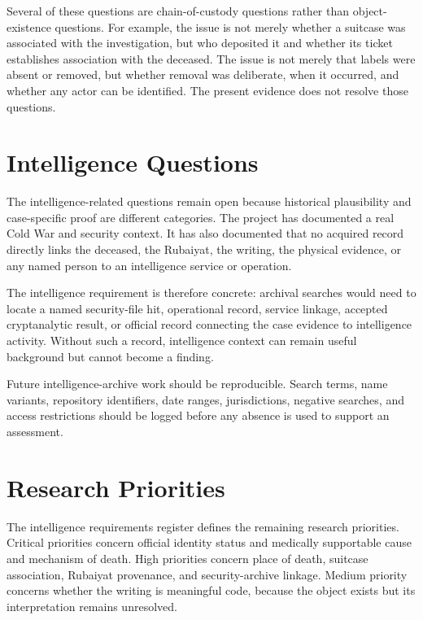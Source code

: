 Several of these questions are chain-of-custody questions rather than object-existence questions. For example, the issue is not merely whether a suitcase was associated with the investigation, but who deposited it and whether its ticket establishes association with the deceased. The issue is not merely that labels were absent or removed, but whether removal was deliberate, when it occurred, and whether any actor can be identified. The present evidence does not resolve those questions.

\section{Intelligence Questions}

The intelligence-related questions remain open because historical plausibility and case-specific proof are different categories. The project has documented a real Cold War and security context. It has also documented that no acquired record directly links the deceased, the Rubaiyat, the writing, the physical evidence, or any named person to an intelligence service or operation.

The intelligence requirement is therefore concrete: archival searches would need to locate a named security-file hit, operational record, service linkage, accepted cryptanalytic result, or official record connecting the case evidence to intelligence activity. Without such a record, intelligence context can remain useful background but cannot become a finding.

Future intelligence-archive work should be reproducible. Search terms, name variants, repository identifiers, date ranges, jurisdictions, negative searches, and access restrictions should be logged before any absence is used to support an assessment.

\section{Research Priorities}

The intelligence requirements register defines the remaining research priorities. Critical priorities concern official identity status and medically supportable cause and mechanism of death. High priorities concern place of death, suitcase association, Rubaiyat provenance, and security-archive linkage. Medium priority concerns whether the writing is meaningful code, because the object exists but its interpretation remains unresolved.

